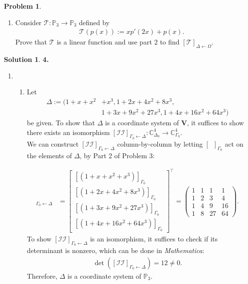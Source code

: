 \documentclass{book}
\theoremstyle{definition}
\newtheorem*{prob*}{Problem}
\newtheorem*{sln*}{Solution}
\newcommand{\V}{\mathbf{V}}
\begin{document}
\begin{prob*}
\begin{enumerate}
	
	\item Consider $\mathcal{T} : \mathbb{P}_3 \rightarrow \mathbb{P}_3$ defined by 
	\begin{align*}
	\mathcal{T}(p(x)) := xp'(2x) + p(x).
	\end{align*}
	Prove that $\mathcal{T}$ is a linear function and use part 2 to find $[\mathcal{T}]_{\Delta\leftarrow \Omega}$.
	
	
	\end{enumerate}



	\begin{sln*}\textbf{4.}
		$\,$
		\begin{enumerate}
			\item 
			\begin{enumerate}
				\item Let 
				\begin{align*}
				\Delta := (1 + x + x^2 &+ x^3, 1 + 2x+4x^2 + 8x^3,\\
				&1 + 3x+9x^2 + 27x^3, 1+ 4x +16x^2 + 64x^3)
				\end{align*}
				be given. To show that $\Delta$ is a coordinate system of $\V$, it suffices to show there exists an isomorphism $[\mathcal{II}]_{{\Gamma_0}\leftarrow\Delta} : \mathbb{C}^4_{\Delta_0}\to\mathbb{C}^4_{\Gamma_0}$. \\
				
				We can construct $[\mathcal{II}]_{{\Gamma_0}\leftarrow\Delta}$ column-by-column by letting $[\,\,\,]_{\Gamma_0}$ act on the elements of $\Delta$, by Part 2 of Problem 3:
				
				\begin{align*}
				[\mathcal{II}]_{\Gamma_0\leftarrow\Delta}
				&= \begin{bmatrix}
				[(1+x+x^2+x^3)]_{\Gamma_0}\\
				[(1+2x+4x^2+8x^3)]_{\Gamma_0} \\ 
				[(1+3x+9x^2+27x^3)]_{\Gamma_0} \\ 
				[(1+4x+16x^2+64x^3)]_{\Gamma_0}
				\end{bmatrix}^\top
				= \begin{pmatrix}
				1&1&1&1\\
				1&2&3&4\\
				1&4&9&16\\
				1&8&27&64
				\end{pmatrix}.
				\end{align*} 
				To show $[\mathcal{II}]_{\Gamma_0\leftarrow\Delta}$ is an isomorphism, it suffices to check if its determinant is nonzero, which can be done in \textit{Mathematica}:
				\begin{align*}
				\det\left([\mathcal{II}]_{\Gamma_0\leftarrow\Delta}\right) = 12 \neq 0.
				\end{align*}
				Therefore, $\Delta$ is a coordinate system of $\mathbb{P}_3$.\\
				

\end{enumerate}
\end{enumerate}
\end{sln*}
\end{prob*}
\end{document}

